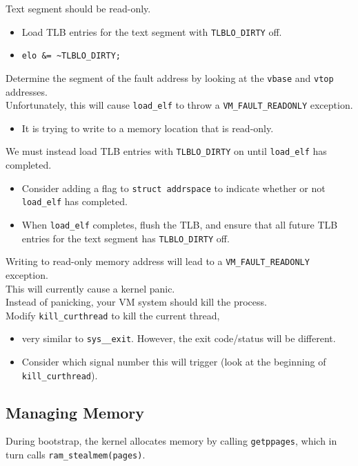 \documentclass[12pt]{article}
\theoremstyle{plain}
\theoremstyle{definition}
\begin{document}
Text segment should be read-only.
\begin{itemize}
  \item Load TLB entries for the text segment with \texttt{TLBLO\_DIRTY} off.
  \item \texttt{elo \&= \textasciitilde TLBLO\_DIRTY;}
\end{itemize}

Determine the segment of the fault address by looking at the \texttt{vbase} and \texttt{vtop} addresses. \\

Unfortunately, this will cause \texttt{load\_elf} to throw a \texttt{VM\_FAULT\_READONLY} exception.
\begin{itemize}
  \item It is trying to write to a memory location that is read-only.
\end{itemize}

We must instead load TLB entries with \texttt{TLBLO\_DIRTY} on until \texttt{load\_elf} has completed.
\begin{itemize}
  \item Consider adding a flag to \texttt{struct addrspace} to indicate whether or not \texttt{load\_elf} has completed.
  \item When \texttt{load\_elf} completes, flush the TLB, and ensure that all future TLB entries for the text segment has \texttt{TLBLO\_DIRTY} off.
\end{itemize}

Writing to read-only memory address will lead to a \texttt{VM\_FAULT\_READONLY} exception. \\
This will currently cause a kernel panic. \\

Instead of panicking, your VM system should kill the process. \\
Modify \texttt{kill\_curthread} to kill the current thread,
\begin{itemize}
  \item very similar to \texttt{sys\_\_exit}.
  However, the exit code/status will be different.
  \item Consider which signal number this will trigger (look at the beginning of \texttt{kill\_curthread}).
\end{itemize}

\subsection{Managing Memory}
During bootstrap, the kernel allocates memory by calling \texttt{getppages}, which in turn calls \texttt{ram\_stealmem(pages)}. \\
\end{document}
